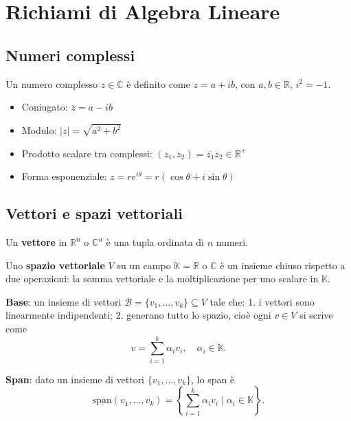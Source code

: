 \documentclass[12pt,a4paper]{article}
\begin{document}
\newpage
\section*{Richiami di Algebra Lineare}

\subsection*{Numeri complessi}
Un numero complesso \( z \in \mathbb{C} \) è definito come \( z = a + ib \), con \( a, b \in \mathbb{R} \), \( i^2 = -1 \).

\begin{itemize}
  \item Coniugato: \( \overline{z} = a - ib \)
  \item Modulo: \( |z| = \sqrt{a^2 + b^2} \)
  \item Prodotto scalare tra complessi: \( (z_1, z_2) = \overline{z_1} z_2 \in\mathbb{R}^+\)
  \item Forma esponenziale: \( z = re^{i\theta} = r(\cos\theta + i\sin\theta) \)
\end{itemize}

\subsection*{Vettori e spazi vettoriali}

Un \textbf{vettore} in \( \mathbb{R}^n \) o \( \mathbb{C}^n \) è una tupla ordinata di \( n \) numeri.

Uno \textbf{spazio vettoriale} \( V \) su un campo \( \mathbb{K} = \mathbb{R} \text{ o } \mathbb{C} \) è un insieme chiuso rispetto a due operazioni:  
la somma vettoriale e la moltiplicazione per uno scalare in \( \mathbb{K} \).

\vspace{0.3cm}

\textbf{Base}: un insieme di vettori \( \mathcal{B} = \{v_1, \dots, v_k\} \subseteq V \) tale che:  
1. i vettori sono linearmente indipendenti;  
2. generano tutto lo spazio, cioè ogni \( v \in V \) si scrive come  
\[
v = \sum_{i=1}^k \alpha_i v_i, \quad \alpha_i \in \mathbb{K}.
\]

\vspace{0.3cm}

\textbf{Span}: dato un insieme di vettori \( \{v_1, \dots, v_k\} \), lo span è  
\[
\text{span}(v_1, \dots, v_k) = \left\{ \sum_{i=1}^k \alpha_i v_i \mid \alpha_i \in \mathbb{K} \right\}.
\]
\end{document}
